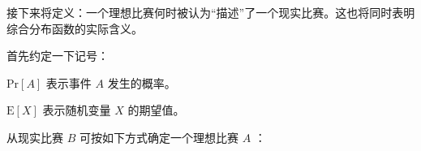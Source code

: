             接下来将定义：一个理想比赛何时被认为“描述”了一个现实比赛。这也将同时表明综合分布函数的实际含义。
            
            \vspace{1.5ex}

            首先约定一下记号：

            \begin{asparaitem}
                \item $\mathrm{Pr}\left[A\right]$ 表示事件 $A$ 发生的概率。
                \item $\mathrm{E}\left[X\right]$ 表示随机变量 $X$ 的期望值。
            \end{asparaitem}

            \begin{definition}
                从现实比赛 $B$ 可按如下方式确定一个理想比赛 $A$ ：


\end{definition}
